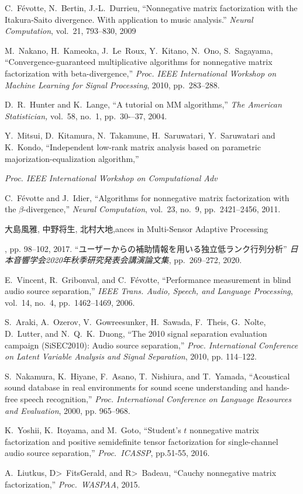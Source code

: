 \documentclass[honka]{nitkagawathesis}%
\begin{document}
\begin{thebibliography}{99}
  C.~Févotte, N.~Bertin, J.-L.~Durrieu, 
  ``Nonnegative matrix factorization with the Itakura-Saito divergence. With application to music analysis.'' 
  {\em Neural Computation}, vol.~21, 793--830, 2009
  
  M.~Nakano, H.~Kameoka, J.~Le~Roux, Y.~Kitano, N.~Ono, S.~Sagayama, ``Convergence-guaranteed multiplicative algorithms for nonnegative matrix factorization with beta-divergence,''
  {\em Proc. IEEE International Workshop on Machine Learning for Signal Processing}, 2010, pp.~283--288.
  
  D.~R.~Hunter and K.~Lange, ``A tutorial on MM algorithms,'' 
  {\em The American Statistician,} vol.~58, no.~1, pp.~30-–37, 2004.
  
  Y.~Mitsui, D.~Kitamura, N.~Takamune, H.~Saruwatari, Y.~Saruwatari and K.~Kondo, ``Independent low-rank matrix analysis based on parametric majorization-equalization algorithm,'' 
  {\em Proc. IEEE International Workshop on Computational Adv  

  C.~Févotte and J.~Idier, 
  ``Algorithms for nonnegative matrix factorization with the $\beta$-divergence,'' 
  {\em Neural Computation}, vol.~23, no.~9, pp.~2421--2456, 2011.

  大島風雅, 中野将生, 北村大地,ances in Multi-Sensor Adaptive Processing}, pp. 98--102, 2017.
``ユーザーからの補助情報を用いる独立低ランク行列分析''
  {\em 日本音響学会2020年秋季研究発表会講演論文集}, pp.~269--272, 2020.    

  E.~Vincent, R.~Gribonval, and C.~F\'evotte, ``Performance measurement in blind audio source separation,'' 
  {\em IEEE Trans. Audio, Speech, and Language Processing}, vol.~14, no.~4, pp.~1462--1469, 2006.
  
  S.~Araki, A.~Ozerov, V.~Gowreesunker, H.~Sawada, F.~Theis, G.~Nolte, D.~Lutter, and N.~Q.~K.~Duong, 
  ``The 2010 signal separation evaluation campaign (SiSEC2010): Audio source separation,'' 
  {\em Proc. International Conference on Latent Variable Analysis and Signal Separation}, 2010, pp. 114–122.
  
  S.~Nakamura, K.~Hiyane, F.~Asano, T.~Nishiura, and T.~Yamada, 
  ``Acoustical sound database in real environments for sound scene understanding and hands-free speech recognition,'' 
  {\em Proc. International Conference on Language Resources and Evaluation}, 2000, pp. 965–968.

  K.~Yoshii, K.~Itoyama, and M.~Goto, ``Student's $t$ nonnegative matrix factorization and positive semidefinite tensor    
  factorization for single-channel audio source separation,''
  {\em Proc.~ICASSP}, pp.51-55, 2016.

  A.~Liutkus, D>~FitsGerald, and R>~Badeau, ``Cauchy nonnegative matrix factorization,''
  {\em Proc.~WASPAA}, 2015.

\end{thebibliography}
% 
\end{document}
